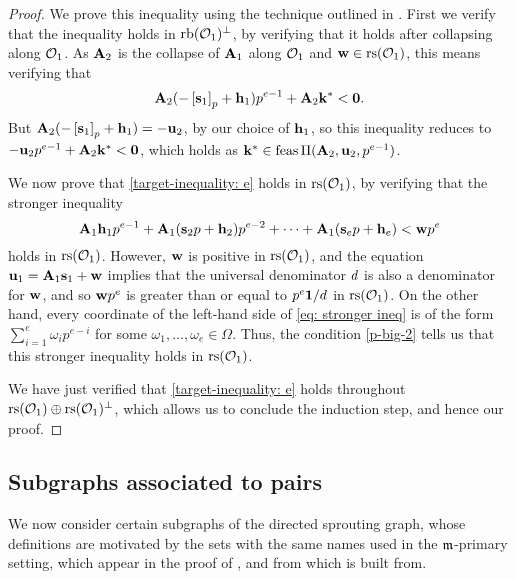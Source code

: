 \documentclass{amsart}
\begin{document}
\begin{proof}
    We prove this inequality using the technique outlined in .
    First we verify that the inequality holds in $\operatorname{rb}(\mathcal{O}_1)^{\perp}$, by verifying that it holds after collapsing along $\mathcal{O}_1$.
    As $\mathbf{A}_2$ is the collapse of $\mathbf{A}_1$ along $\mathcal{O}_1$ and $\mathbf{w}\in \operatorname{rs}(\mathcal{O}_1)$, this means verifying that
    \[\mathbf{A}_2( - \left[ \mathbf{s}_1 \right]_p + \mathbf{h}_1 ) p^{e-1} + \mathbf{A}_2\mathbf{k}^{\ast} < \mathbf{0}.\]
    But $\mathbf{A}_2( - \left[ \mathbf{s}_1 \right]_p + \mathbf{h}_1 ) = -\mathbf{u}_2$, by our choice of $\mathbf{h}_1$, so this inequality reduces to $-\mathbf{u}_2 p^{e-1} + \mathbf{A}_2 \mathbf{k}^{\ast} < \mathbf{0}$, which holds as $\mathbf{k}^{\ast} \in \operatorname{feas} \Pi(\mathbf{A}_2, \mathbf{u}_2, p^{e-1})$.

    We now prove that \eqref{target-inequality: e} holds in $\operatorname{rs}(\mathcal{O}_1)$, by verifying that the stronger inequality
    \begin{equation}
       \mathbf{A}_1 \mathbf{h}_1 p^{e-1} + \mathbf{A}_1 (\mathbf{s}_2 p + \mathbf{h}_2)p^{e-2} + \cdots + \mathbf{A}_1 (\mathbf{s}_e p + \mathbf{h}_e ) < \mathbf{w}p^e
       \label{eq: stronger ineq}
    \end{equation}
    holds in $\operatorname{rs}(\mathcal{O}_1)$.
    However, $\mathbf{w}$ is positive in $\operatorname{rs}(\mathcal{O}_1)$, and the equation $\mathbf{u}_1 = \mathbf{A}_1 \mathbf{s}_1 + \mathbf{w}$ implies that the universal denominator $d$ is also a denominator for $\mathbf{w}$, and so $\mathbf{w} p^e$ is greater than or equal to $p^e \mathbf{1} / d$ in $\operatorname{rs}(\mathcal{O}_1)$.
    On the other hand, every coordinate of the left-hand side of \eqref{eq: stronger ineq} is of the form $\sum_{i=1}^{e} \omega_i  p^{e-i}$ for some $\omega_1, \ldots, \omega_e \in \Omega$.
    Thus, the condition \eqref{p-big-2} tells us that this stronger inequality holds in $\operatorname{rs}(\mathcal{O}_1)$.

    We have just verified that \eqref{target-inequality: e} holds throughout $\operatorname{rs}(\mathcal{O}_1) \oplus \operatorname{rs}(\mathcal{O}_1)^{\perp}$, which allows us to conclude the induction step, and hence our proof.
\end{proof}


\subsection{Subgraphs associated to pairs}

We now consider certain subgraphs of the directed sprouting graph, whose definitions are motivated by the sets with the same names used in the $\mathfrak{m}$-primary setting, which appear in the proof of , and from which  is built from.
\end{document}
